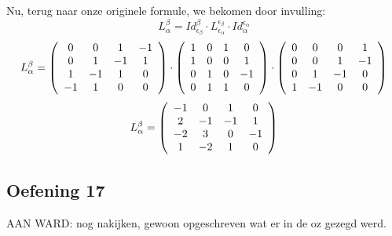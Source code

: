 \documentclass[lineaire_algebra_oplossingen.tex]{subfiles}
\begin{document}
Nu, terug naar onze originele formule, we bekomen door invulling:
\[
L^\beta_\alpha = Id^\beta_{\epsilon_\beta}\cdot L^{\epsilon_\beta}_{\epsilon_\alpha}\cdot Id^{\epsilon_\alpha}_{\alpha}
\]
\[L^\beta_\alpha = \left(
\begin{array}{c c c c}
0 & 0 & 1 & -1 \\ 
0 & 1 & -1 & 1 \\ 
1 & -1 & 1 & 0 \\ 
-1 & 1 & 0 & 0 \\ 
\end{array}
\right) \cdot \left(\begin{array}{c c c c}
1 & 0 & 1 & 0 \\ 
1 & 0 & 0 & 1 \\ 
0 & 1 & 0 & -1 \\ 
0 & 1 & 1 & 0 \\ 
\end{array}
\right) \cdot \left(
\begin{array}{c c c c}
0 & 0 & 0 & 1 \\ 
0 & 0 & 1 & -1 \\ 
0 & 1 & -1 & 0 \\ 
1 & -1 & 0 & 0 \\
\end{array}
\right)
\]
\[L^\beta_\alpha = \left(
\begin{array}{c c c c}
-1 & 0 & 1 & 0 \\ 
2 & -1 & -1 & 1 \\ 
-2 & 3 & 0 & -1 \\ 
1 & -2 & 1 & 0 \\
\end{array}
\right)
\]


\subsection{Oefening 17}
AAN WARD: nog nakijken, gewoon opgeschreven wat er in de oz gezegd werd.
\end{document}
